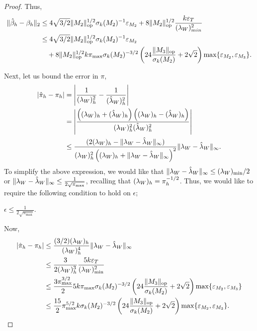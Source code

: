 \begin{proof}
Thus,
\begin{align*}
  \|\hat \beta_h - \beta_h\|_2
  &\le 4\sqrt{3/2} \|M_2\|_{\text{\rm op}}^{1/2} \sigma_k(M_2)^{-1} \varepsilon_{M_2} 
    + 8 \|M_2\|_{\text{\rm op}}^{1/2} \frac{k \varepsilon_{T}}{(\lambda_W)_{min}^2} \\
    &\le 4\sqrt{3/2} \|M_2\|_{\text{\rm op}}^{1/2} \sigma_k(M_2)^{-1} \varepsilon_{M_2} \\
  &\quad + 8 \|M_2\|_{\text{\rm op}}^{1/2} k \pi_{\max} 
    \sigma_k(M_2)^{-3/2}
      \left(24 \frac{\| {M_3} \|_{\text{\rm op}}}{\sigma_k(M_2)} + 2\sqrt{2} \right)
      \max\{\varepsilon_{M_2}, \varepsilon_{M_3}\}.
\end{align*}

Next, let us bound the error in $\pi$,
\begin{align*}
  |\hat \pi_h - \pi_h |
  &= \left| \frac{1}{(\lambda_W)_h^2} - \frac{1}{({\hat\lambda}_W)_h^2} \right| \\
  &= \left| \frac{\left( (\lambda_W)_h + ({\hat\lambda}_W)_h \right) \left( (\lambda_W)_h - ({\hat\lambda}_W)_h \right)}
  {(\lambda_W)_h^2({\hat\lambda}_W)_h^2} \right| \\
  &\le \frac{( 2(\lambda_W)_h - \|\lambda_W - {\hat\lambda}_W\|_{\infty} )}{(\lambda_W)_h^2 \left( (\lambda_W)_h + \|\lambda_W - {\hat\lambda}_W\|_{\infty} \right)^2} \|\lambda_W - {\hat\lambda}_W\|_{\infty}.
\end{align*}
To simplify the above expression, we would like that $\|\lambda_W - {\hat\lambda}_W
\|_{\infty} \le (\lambda_W)_{\min}/2$ or $\|\lambda_W - {\hat\lambda}_W \|_{\infty} \le
\frac{1}{2\sqrt{\pi_{\max}}}$, recalling that $(\lambda_W)_h = \pi_h^{-1/2}$. Thus,
we would like to require the following condition to hold on $\epsilon$;  
\begin{condition}
  $\epsilon \le \frac{1}{2\sqrt{\pi_{\max}}}$.
\end{condition}

Now,
\begin{align*}
  |\hat \pi_h - \pi_h |
  &\le \frac{(3/2)(\lambda_W)_h}{(\lambda_W)_h^4}
  \|\lambda_W - {\hat\lambda}_W\|_{\infty} \\
  &\le \frac{3}{2(\lambda_W)_h^3} \frac{5 k \varepsilon_{T}}{(\lambda_W)_{\min}^2} \\
  &\le \frac{3 \pi_{\max}^{3/2}}{2} 5 k \pi_{\max} 
    \sigma_k(M_2)^{-3/2}
    \left(24 \frac{\| {M_3} \|_{\text{\rm op}}}{\sigma_k(M_2)} + 2\sqrt{2} \right) \max\{\varepsilon_{M_2}, \varepsilon_{M_3}\} \\
    &\le \frac{15}{2} \pi_{\max}^{5/2} k 
    \sigma_k(M_2)^{-3/2}
    \left(24 \frac{\| {M_3} \|_{\text{\rm op}}}{\sigma_k(M_2)} + 2\sqrt{2} \right) \max\{\varepsilon_{M_2}, \varepsilon_{M_3}\}.
\end{align*}


\end{proof}
